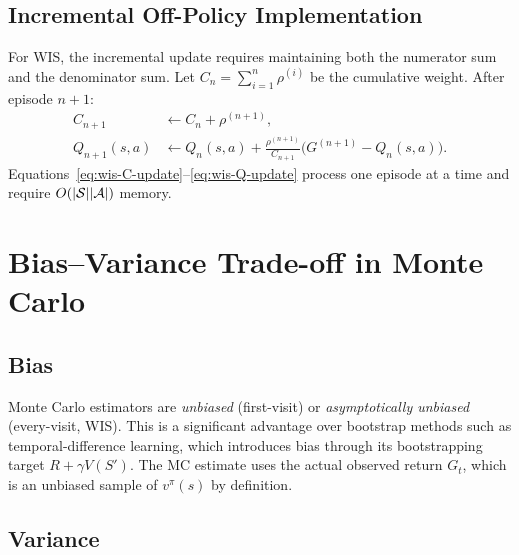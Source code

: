 \subsection*{Incremental Off-Policy Implementation}

For WIS, the incremental update requires maintaining both the numerator sum and the denominator sum.  Let $C_n = \sum_{i=1}^n \rho^{(i)}$ be the cumulative weight.  After episode $n+1$:
\begin{align}
  C_{n+1} &\leftarrow C_n + \rho^{(n+1)}, \label{eq:wis-C-update} \\
  Q_{n+1}(s,a) &\leftarrow Q_n(s,a) + \frac{\rho^{(n+1)}}{C_{n+1}}\bigl(G^{(n+1)} - Q_n(s,a)\bigr). \label{eq:wis-Q-update}
\end{align}
Equations~\eqref{eq:wis-C-update}--\eqref{eq:wis-Q-update} process one episode at a time and require $O(|\mathcal{S}||\mathcal{A}|)$ memory.


\section{Bias--Variance Trade-off in Monte Carlo}
\label{sec:mc-bias-variance}

\subsection*{Bias}

Monte Carlo estimators are \emph{unbiased} (first-visit) or \emph{asymptotically unbiased} (every-visit, WIS).  This is a significant advantage over bootstrap methods such as temporal-difference learning, which introduces bias through its bootstrapping target $R + \gamma V(S')$.  The MC estimate uses the actual observed return $G_t$, which is an unbiased sample of $v^\pi(s)$ by definition.

\subsection*{Variance}

